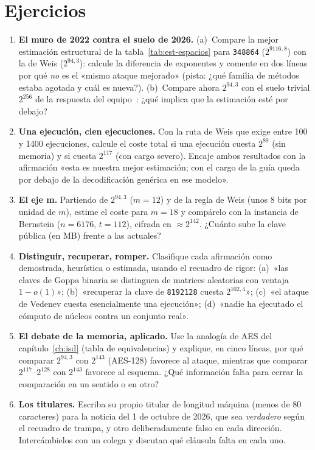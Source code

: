 \section{Ejercicios}

\begin{enumerate}[leftmargin=1.6em,itemsep=4pt]
  \item \textbf{El muro de 2022 contra el suelo de 2026.}
        (a)~Compare la mejor estimación estructural de la
        tabla~\ref{tab:est-espacios} para \texttt{348864}
        ($2^{9116{,}8}$) con la de Weis ($2^{94{,}3}$): calcule la
        diferencia de exponentes y comente en dos líneas por qué
        \emph{no} es el «mismo ataque mejorado» (pista: ¿qué
        familia de métodos estaba agotada y cuál es nueva?).
        (b)~Compare ahora $2^{94{,}3}$ con el suelo trivial $2^{256}$
        de la respuesta del equipo~\cite{cm529}: ¿qué implica que
        la estimación esté por debajo?
  \item \textbf{Una ejecución, cien ejecuciones.} Con la ruta de
        Weis que exige entre 100 y 1400 ejecuciones, calcule el
        coste total si una ejecución cuesta $2^{89}$ (sin memoria)
        y si cuesta $2^{117}$ (con cargo severo). Encaje ambos
        resultados con la afirmación «esta es nuestra mejor
        estimación; con el cargo de la guía queda por debajo de la
        decodificación genérica en ese modelo».
  \item \textbf{El eje m.} Partiendo de $2^{94{,}3}$ ($m=12$) y de
        la regla de Weis (unos 8 bits por unidad de $m$), estime el
        coste para $m=18$ y compárelo con la instancia de Bernstein
        ($n=6176$, $t=112$), cifrada en $\approx 2^{142}$.
        ¿Cuánto sube la clave pública (en MB) frente a las actuales?
  \item \textbf{Distinguir, recuperar, romper.} Clasifique cada
        afirmación como demostrada, heurística o estimada, usando
        el recuadro de rigor: (a)~«las claves de Goppa binaria se
        distinguen de matrices aleatorias con ventaja
        $1-o(1)$»; (b)~«recuperar la clave de \texttt{8192128}
        cuesta $2^{102{,}4}$»; (c)~«el ataque de Vedenev cuesta
        esencialmente una ejecución»; (d)~«nadie ha ejecutado el
        cómputo de núcleos contra un conjunto real».
  \item \textbf{El debate de la memoria, aplicado.} Use la
        analogía de AES del capítulo~\ref{ch:isd} (tabla de
        equivalencias) y explique, en cinco líneas, por qué
        comparar $2^{94{,}3}$ con $2^{143}$ (AES-128) favorece al
        ataque, mientras que comparar $2^{117}$--$2^{128}$ con
        $2^{143}$ favorece al esquema. ¿Qué información falta para
        cerrar la comparación en un sentido o en otro?
  \item \textbf{Los titulares.} Escriba su propio titular de
        longitud máquina (menos de 80 caracteres) para la noticia
        del 1 de octubre de 2026, que sea \emph{verdadero} según el
        recuadro de trampa, y otro deliberadamente falso en cada
        dirección. Intercámbielos con un colega y discutan qué
        cláusula falta en cada uno.
\end{enumerate}

